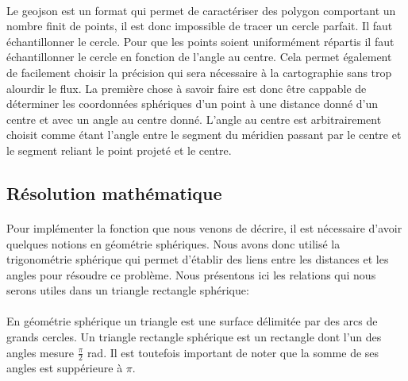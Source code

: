 \documentclass[a4paper]{report}
\begin{document}
\paragraph{} Le geojson est un format qui permet de caractériser des polygon comportant un nombre finit de points, il est donc impossible de tracer un cercle parfait. Il faut échantillonner le cercle. Pour que les points soient uniformément répartis il faut échantillonner le cercle en fonction de l'angle au centre. Cela permet également de facilement choisir la précision qui sera nécessaire à la cartographie sans trop alourdir le flux. La première chose à savoir faire est donc être cappable de déterminer les coordonnées sphériques d'un point à une distance donné d'un centre et avec un angle au centre donné. L'angle au centre est arbitrairement choisit comme étant l'angle entre le segment du méridien passant par le centre et le segment reliant le point projeté et le centre.

\subsection{Résolution mathématique}

\paragraph{} Pour implémenter la fonction que nous venons de décrire, il est nécessaire d'avoir quelques notions en géométrie sphériques. Nous avons donc utilisé la trigonométrie sphérique qui permet d'établir des liens entre les distances et les angles pour résoudre ce problème. Nous présentons ici les relations qui nous serons utiles dans un triangle rectangle sphérique:

\paragraph{} En géométrie sphérique un triangle est une surface délimitée par des arcs de grands cercles. Un triangle rectangle sphérique est un rectangle dont l'un des angles mesure $\frac{\pi}{2}$ rad. Il est toutefois important de noter que la somme de ses angles est suppérieure à $\pi$.
\end{document}
